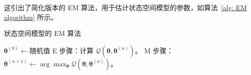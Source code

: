 这引出了简化版本的 EM 算法，用于估计状态空间模型的参数，如算法~\ref{alg: EM algorithm} 所示。

\begin{algorithm}[tb]
    \caption{状态空间模型的 EM 算法}
    \label{alg: EM algorithm}
    \begin{algorithmic}[1]
        \STATE \(\boldsymbol{\theta}^{(0)} \gets \text{随机值}\)
            \STATE E 步骤：计算 \(\mathcal{Q}(\boldsymbol{\theta}, \boldsymbol{\theta}^{(n)})\)。
            \STATE M 步骤：\(\boldsymbol{\theta}^{(n+1)} \gets \arg \max_{\boldsymbol{\theta}} \mathcal{Q}(\boldsymbol{\theta}, \boldsymbol{\theta}^{(n)})\)。
        \ENDFOR
    \end{algorithmic}
\end{algorithm}

